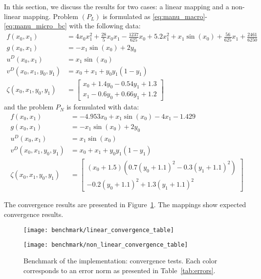 \documentclass{article}
\begin{document}
In this section, we discuss the results for two cases: a linear mapping and a non-linear mapping.
Problem $(P_L)$ is formulated as \eqref{eq:manu_macro}-\eqref{eq:manu_micro_bc} with the following data:
\begin{equation}
    \begin{split}
        f(x_0,x_1) &= 4x_0x_1^2 + \frac{28}{5}x_0x_1 - \frac{1237}{625}x_0 + 5.2x_1^2 + x_1\sin(x_0) + \frac{56}{625}x_1 + \frac{2461}{6250}\\
        g(x_0,x_1) &= -x_1\sin(x_0) + 2y_0\\
        u^D(x_0,x_1) &= x_1\sin(x_0)\\
        v^D(x_0,x_1,y_0,y_1) &= x_0 + x_1 + y_0y_1(1-y_1)\\
        \zeta(x_0,x_1,y_0,y_1) &= \begin{bmatrix}
            x_0 + 1.4y_0 - 0.54y_1 + 1.3\\
            x_1 - 0.6y_0 + 0.66y_1 + 1.2
        \end{bmatrix}
    \end{split}
\end{equation}
and the problem $P_{N}$ is formulated with data:
\begin{equation}
    \begin{split}
        f(x_0,x_1) &= -4.953 x_0 + x_1\sin(x_0) - 4x_1 - 1.429\\
        g(x_0,x_1) &= -x_1\sin(x_0) + 2y_0\\
        u^D(x_0,x_1) &= x_1\sin(x_0)\\
        v^D(x_0,x_1,y_0,y_1) &= x_0 + x_1 + y_0y_1(1-y_1)\\
        \zeta(x_0,x_1,y_0,y_1) &= \begin{bmatrix}
            (x_0 + 1.5)\left(0.7(y_0 + 1.1)^2 - 0.3(y_1 + 1.1)^2\right)\\
            -0.2(y_0 + 1.1)^2 + 1.3(y_1 + 1.1)^2
        \end{bmatrix}
    \end{split}
\end{equation}

The convergence results are presented in Figure~\ref{fig:benchmark}. The mappings show expected convergence results.
\begin{figure}[h!]
    \centering
    \begin{minipage}{.45\textwidth}
        \texttt{[image: benchmark/linear\_convergence\_table]}
    \end{minipage}%
    \begin{minipage}{.45\textwidth}
        \texttt{[image: benchmark/non\_linear\_convergence\_table]}
    \end{minipage}
    \caption{Benchmark of the implementation: convergence tests. Each color corresponds to an error norm as presented in Table~\ref{tab:errors}.}
    \label{fig:benchmark}
\end{figure}
\end{document}
